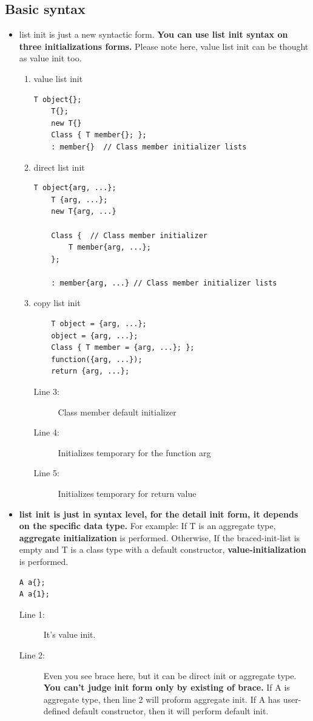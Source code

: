 \documentclass[a4paper,11pt,twoside]{book}
\begin{document}
\subsection{Basic syntax}
\begin{itemize}
		
	\item list init is just a new syntactic form. \textbf{You can use list init syntax on three initializations forms.} Please note here, value list init can be thought as value init too.  
	\begin{enumerate}
		\item value list init
\begin{lstlisting}[numbers=none]
	T object{};
	T{};
	new T{}
	Class { T member{}; };
	: member{}  // Class member initializer lists
\end{lstlisting}
		\item direct list init
\begin{lstlisting}[numbers=none]
	T object{arg, ...};
	T {arg, ...};
	new T{arg, ...}
	
	Class {  // Class member initializer
		T member{arg, ...}; 
	};
			
	: member{arg, ...} // Class member initializer lists
\end{lstlisting}
		\item copy list init
\begin{lstlisting}
	T object = {arg, ...};
	object = {arg, ...};
	Class { T member = {arg, ...}; };
	function({arg, ...}); 
	return {arg, ...};  
\end{lstlisting}
		\begin{description}
			\item[Line 3:] Class member default initializer
			\item[Line 4:] Initializes temporary for the function arg
			\item[Line 5:] Initializes temporary for return value
		\end{description}
	\end{enumerate}
	
	\item \textbf{list init is just in syntax level, for the detail init form, it depends on the specific data type.}  For example: If T is an aggregate type, \textbf{aggregate initialization} is performed. Otherwise, If the braced-init-list is empty and T is a class type with a default constructor, \textbf{value-initialization} is performed.
	
\begin{lstlisting}
A a{};
A a{1};	
\end{lstlisting}
	\begin{description}
		\item[Line 1:] It's value init.
		\item[Line 2:] Even you see brace here, but it can be direct init or aggregate type. \textbf{You can't judge init form only by existing of brace.} If A is aggregate type, then line 2 will proform aggregate init. If A has user-defined default constructor, then it will perform default init. 
	\end{description}
	

\end{itemize}
\end{document}
